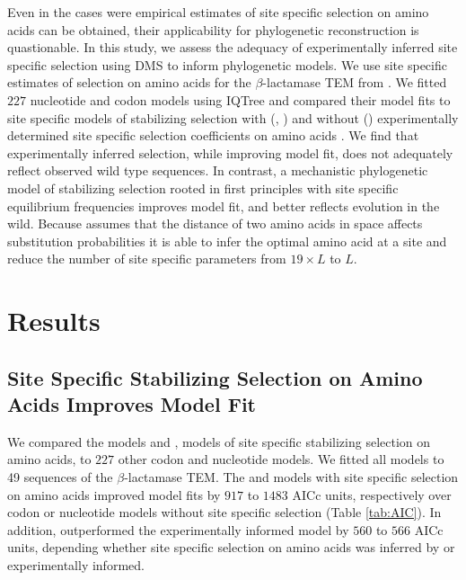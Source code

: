 Even in the cases were empirical estimates of site specific selection on amino acids can be obtained, their applicability for phylogenetic reconstruction is quastionable.
In this study, we assess the adequacy of experimentally inferred site specific selection using DMS to inform phylogenetic models.
We use site specific estimates of selection on amino acids for the $\beta$-lactamase TEM from \citet{stiffler2016}.
We fitted $227$ nucleotide and codon models using IQTree and compared their model fits to site specific models of stabilizing selection with (\phydms, \selacDMS) and without (\selac) experimentally determined site specific selection coefficients on amino acids \citep{nguyen2015,hilton2017,beaulieu2018}.
We find that experimentally inferred selection, while improving model fit, does not adequately reflect observed wild type sequences.
In contrast, \selac \citep{beaulieu2018} a mechanistic phylogenetic model of stabilizing selection rooted in first principles with site specific equilibrium frequencies improves model fit, and better reflects evolution in the wild.
Because \selac assumes that the distance of two amino acids in \PC space affects substitution probabilities it is able to infer the optimal amino acid at a site and reduce the number of site specific parameters from $19\times L$ to $L$.

\section{Results}

\subsection{Site Specific Stabilizing Selection on Amino Acids Improves Model Fit}
We compared the models \phydms \citep{hilton2017} and \selac \citep{beaulieu2018}, models of site specific stabilizing selection on amino acids, to $227$ other codon and nucleotide models.
We fitted all models to 49 sequences of the $\beta$-lactamase TEM.
The \phydms and \selac models with site specific selection on amino acids improved model fits by $917$ to $1483$ AICc units, respectively over codon or nucleotide models without site specific selection (Table \ref{tab:AIC}).
In addition, \selac outperformed the experimentally informed model \phydms by $560$ to $566$ AICc units, depending whether site specific selection on amino acids was inferred by \selac or experimentally informed.

